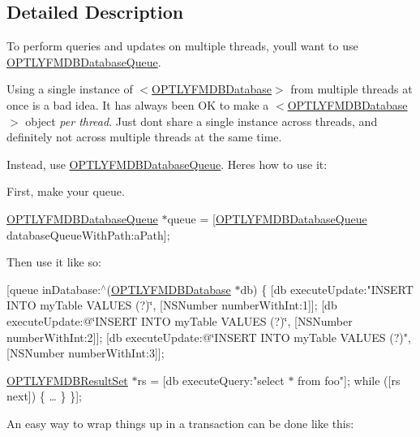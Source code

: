 \subsection{Detailed Description}
To perform queries and updates on multiple threads, you\textquotesingle{}ll want to use {\ttfamily \mbox{\hyperlink{interface_o_p_t_l_y_f_m_d_b_database_queue}{O\+P\+T\+L\+Y\+F\+M\+D\+B\+Database\+Queue}}}.

Using a single instance of {\ttfamily $<$\mbox{\hyperlink{interface_o_p_t_l_y_f_m_d_b_database}{O\+P\+T\+L\+Y\+F\+M\+D\+B\+Database}}$>$} from multiple threads at once is a bad idea. It has always been OK to make a {\ttfamily $<$\mbox{\hyperlink{interface_o_p_t_l_y_f_m_d_b_database}{O\+P\+T\+L\+Y\+F\+M\+D\+B\+Database}}$>$} object {\itshape per thread}. Just don\textquotesingle{}t share a single instance across threads, and definitely not across multiple threads at the same time.

Instead, use {\ttfamily \mbox{\hyperlink{interface_o_p_t_l_y_f_m_d_b_database_queue}{O\+P\+T\+L\+Y\+F\+M\+D\+B\+Database\+Queue}}}. Here\textquotesingle{}s how to use it\+:

First, make your queue.

\mbox{\hyperlink{interface_o_p_t_l_y_f_m_d_b_database_queue}{O\+P\+T\+L\+Y\+F\+M\+D\+B\+Database\+Queue}} $\ast$queue = \mbox{[}\mbox{\hyperlink{interface_o_p_t_l_y_f_m_d_b_database_queue}{O\+P\+T\+L\+Y\+F\+M\+D\+B\+Database\+Queue}} database\+Queue\+With\+Path\+:a\+Path\mbox{]};

Then use it like so\+:

\mbox{[}queue in\+Database\+:$^\wedge$(\mbox{\hyperlink{interface_o_p_t_l_y_f_m_d_b_database}{O\+P\+T\+L\+Y\+F\+M\+D\+B\+Database}} $\ast$db) \{ \mbox{[}db execute\+Update\+:"I\+N\+S\+E\+RT I\+N\+TO my\+Table V\+A\+L\+U\+ES (?)\char`\"{}, \mbox{[}\+N\+S\+Number number\+With\+Int\+:1\mbox{]}\mbox{]};
        \mbox{[}db execute\+Update\+:@\char`\"{}I\+N\+S\+E\+RT I\+N\+TO my\+Table V\+A\+L\+U\+ES (?)\char`\"{}, \mbox{[}\+N\+S\+Number number\+With\+Int\+:2\mbox{]}\mbox{]};
        \mbox{[}db execute\+Update\+:@\char`\"{}I\+N\+S\+E\+RT I\+N\+TO my\+Table V\+A\+L\+U\+ES (?)", \mbox{[}N\+S\+Number number\+With\+Int\+:3\mbox{]}\mbox{]};

\mbox{\hyperlink{interface_o_p_t_l_y_f_m_d_b_result_set}{O\+P\+T\+L\+Y\+F\+M\+D\+B\+Result\+Set}} $\ast$rs = \mbox{[}db execute\+Query\+:"select $\ast$ from foo"\mbox{]}; while (\mbox{[}rs next\mbox{]}) \{ … \} \}\mbox{]};

An easy way to wrap things up in a transaction can be done like this\+:

